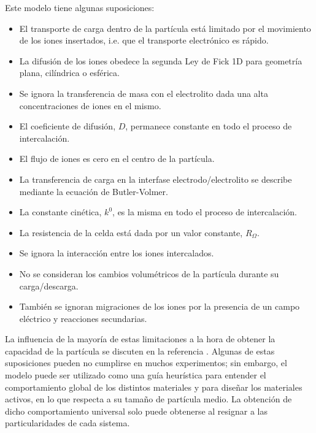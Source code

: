 Este modelo tiene algunas suposiciones:
\begin{itemize}
    \item El transporte de carga dentro de la partícula está limitado por el
        movimiento de los iones insertados, i.e. que el transporte electrónico
        es rápido.
    \item La difusión de los iones obedece la segunda Ley de Fick 1D para 
        geometría plana, cilíndrica o esférica.
    \item Se ignora la transferencia de masa con el electrolito dada una alta 
        concentraciones de iones en el mismo.
    \item El coeficiente de difusión, $D$, permanece constante en todo el 
        proceso de intercalación.
    \item El flujo de iones es cero en el centro de la partícula.
    \item La transferencia de carga en la interfase electrodo/electrolito se 
        describe mediante la ecuación de Butler-Volmer.
    \item La constante cinética, $k^0$, es la misma en todo el proceso de 
        intercalación.
    \item La resistencia de la celda está dada por un valor constante, 
        $R_{\Omega}$.
    \item Se ignora la interacción entre los iones intercalados.
    \item No se consideran los cambios volumétricos de la partícula durante su 
        carga/descarga.
    \item También se ignoran migraciones de los iones por la presencia de un 
        campo eléctrico y reacciones secundarias.
\end{itemize}
La influencia de la mayoría de estas limitaciones a la hora de obtener la 
capacidad de la partícula se discuten en la referencia \cite{gavilan2023}. Algunas
de estas suposiciones pueden no cumplirse en muchos experimentos; sin embargo, el 
modelo puede ser utilizado como una guía heurística para entender el 
comportamiento global de los distintos materiales y para diseñar los materiales
activos, en lo que respecta a su tamaño de partícula medio. La obtención de dicho
comportamiento universal solo puede obtenerse al resignar a las particularidades
de cada sistema. 

